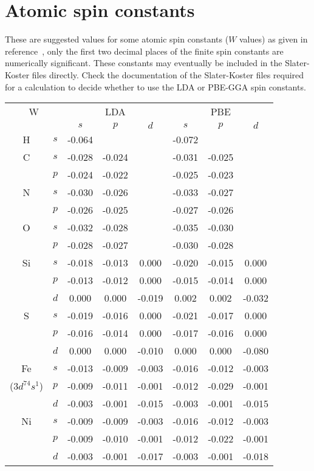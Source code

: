 
\chapter{Atomic spin constants}
\label{app:spinconst}

These are suggested values for some atomic spin constants ($W$ values)
as given in reference~\cite{KoehlerThesis}, only the first two decimal
places of the finite spin constants are numerically significant. These
constants may eventually be included in the Slater-Koster files
directly. Check the documentation of the Slater-Koster files required
for a calculation to decide whether to use the LDA or PBE-GGA spin
constants.

\begin{center}
\begin{tabular}{|cc|ccc|ccc|} \hline
\multicolumn{2}{|c|}{W}
   & \multicolumn{3}{c|}{LDA}   & \multicolumn{3}{c|}{PBE} \\ \cline{3-8}
   &     & $s$ & $p$ & $d$       &  $s$ & $p$ & $d$ \\ \hline
H  & $s$ & -0.064 &        &        & -0.072 &        & \\\hline  
C  & $s$ & -0.028 & -0.024 &        & -0.031 & -0.025 & \\  
   & $p$ & -0.024 & -0.022 &        & -0.025 & -0.023 & \\\hline  
N  & $s$ & -0.030 & -0.026 &        & -0.033 & -0.027 & \\  
   & $p$ & -0.026 & -0.025 &        & -0.027 & -0.026 & \\\hline  
O  & $s$ & -0.032 & -0.028 &        & -0.035 & -0.030 & \\  
   & $p$ & -0.028 & -0.027 &        & -0.030 & -0.028 & \\\hline 
Si & $s$ & -0.018 & -0.013 &  0.000 & -0.020 & -0.015 &  0.000\\
   & $p$ & -0.013 & -0.012 &  0.000 & -0.015 & -0.014 &  0.000\\
   & $d$ &  0.000 &  0.000 & -0.019 &  0.002 &  0.002 & -0.032\\\hline
S  & $s$ & -0.019 & -0.016 &  0.000 & -0.021 & -0.017 &  0.000\\
   & $p$ & -0.016 & -0.014 &  0.000 & -0.017 & -0.016 &  0.000\\
   & $d$ &  0.000 &  0.000 & -0.010 &  0.000 &  0.000 & -0.080\\\hline
Fe & $s$ & -0.013 & -0.009 & -0.003 & -0.016 & -0.012 & -0.003\\
($3d^74s^1$)
   & $p$ & -0.009 & -0.011 & -0.001 & -0.012 & -0.029 & -0.001\\
   & $d$ & -0.003 & -0.001 & -0.015 & -0.003 & -0.001 & -0.015\\\hline
Ni & $s$ & -0.009 & -0.009 & -0.003 & -0.016 & -0.012 & -0.003\\
   & $p$ & -0.009 & -0.010 & -0.001 & -0.012 & -0.022 & -0.001\\
   & $d$ & -0.003 & -0.001 & -0.017 & -0.003 & -0.001 & -0.018\\\hline
\end{tabular}
\end{center}
